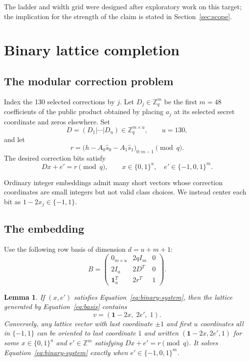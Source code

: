 \documentclass[11pt,a4paper]{article}
\newtheorem{lemma}[theorem]{Lemma}
\newcommand{\Z}{\mathbb{Z}}
\begin{document}
The ladder and width grid were designed after exploratory work on this target;
the implication for the strength of the claim is stated in
Section~\ref{sec:scope}.

\section{Binary lattice completion}
\label{sec:lattice}

\subsection{The modular correction problem}

Index the 130 selected corrections by $j$.  Let $D_j\in\Z_q^{m}$ be the first
$m=48$ coefficients of the public product obtained by placing $a_j$ at its
selected secret coordinate and zeros elsewhere.  Set
\begin{equation}
  D=(D_1|\cdots|D_u)\in\Z_q^{m\times u},\qquad u=130,
\end{equation}
and let
\begin{equation}
  r=\bigl(h-A_0\widehat s_0-A_1\widehat s_1\bigr)_{0:m-1}
       \pmod q.
\end{equation}
The desired correction bits satisfy
\begin{equation}
                         Dx+e'=r\pmod q,
       \qquad x\in\{0,1\}^{u},\quad e'\in\{-1,0,1\}^{m}.
\label{eq:binary-system}
\end{equation}

Ordinary integer embeddings admit many short vectors whose correction
coordinates are small integers but not valid class choices.  We instead
center each bit as $1-2x_j\in\{-1,1\}$.

\subsection{The embedding}

Use the following row basis of dimension $d=u+m+1$:
\begin{equation}
B=\begin{pmatrix}
 0_{m\times u} & 2qI_m & 0\\
 2I_u          & 2D^T   & 0\\
 \mathbf{1}_u^T& 2r^T   & 1
\end{pmatrix}.
\label{eq:basis}
\end{equation}

\begin{lemma}
If $(x,e')$ satisfies Equation~\eqref{eq:binary-system}, then the lattice
generated by Equation~\eqref{eq:basis} contains
\[
                    v=(\mathbf{1}-2x,\;2e',\;1).
\]
Conversely, any lattice vector with last coordinate $\pm1$ and first $u$
coordinates all in $\{-1,1\}$ can be oriented to last coordinate $1$ and
written $(\mathbf{1}-2x,2e',1)$ for some
$x\in\{0,1\}^{u}$ and $e'\in\Z^m$ satisfying $Dx+e'=r\pmod q$.
It solves Equation~\eqref{eq:binary-system} exactly when
$e'\in\{-1,0,1\}^m$.
\end{lemma}
\end{document}
